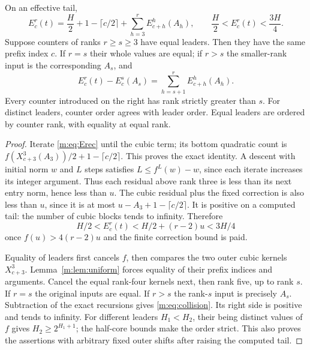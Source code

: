 \begin{lemma}\label{m:lem:counter}
On an effective tail,
\begin{equation}\label{m:eq:counter-expand}
 E^r_c(t)=\frac H2+1-\lceil c/2\rceil
                  +\sum_{h=3}^r E^h_{c+h}(A_h),
 \qquad \frac H2<E^r_c(t)<\frac{3H}{4}.
\end{equation}
Suppose counters of ranks $r\ge s\ge3$ have equal leaders. Then they
have the same prefix index $c$. If $r=s$ their whole values are equal;
if $r>s$ the smaller-rank input is the corresponding $A_s$, and
\begin{equation}\label{m:eq:collision}
 E^r_c(t)-E^s_c(A_s)=\sum_{h=s+1}^r E^h_{c+h}(A_h).
\end{equation}
Every counter introduced on the right has rank strictly greater than $s$.
For distinct leaders, counter order agrees with leader order. Equal
leaders are ordered by counter rank, with equality at equal rank.
\end{lemma}
\begin{proof}
Iterate \eqref{m:eq:Erec} until the cubic term; its bottom quadratic count
is $f(X^3_{c+3}(A_3))/2+1-\lceil c/2\rceil$. This proves the exact
identity. A descent with initial norm $w$ and $L$ steps satisfies
$L\le f^L(w)-w$, since each iterate increases its integer argument.
Thus each residual above rank three is less than its next entry norm,
hence less than $u$. The cubic residual plus the fixed correction is also
less than $u$, since it is at most $u-A_3+1-\lceil c/2\rceil$.
It is positive on a computed tail: the number of cubic blocks tends to
infinity. Therefore
\[
 H/2<E^r_c(t)<H/2+(r-2)u<3H/4
\]
once $f(u)>4(r-2)u$ and the finite correction bound is paid.

Equality of leaders first cancels $f$, then compares the two outer cubic
kernels $X^3_{c+3}$. Lemma~\ref{m:lem:uniform} forces equality of their
prefix indices and arguments. Cancel the equal rank-four kernels next,
then rank five, up to rank $s$. If $r=s$ the original inputs are equal.
If $r>s$ the rank-$s$ input is precisely $A_s$. Subtraction of the exact
recursions gives \eqref{m:eq:collision}. Its right side is positive and tends
to infinity. For different leaders $H_1<H_2$, their being distinct values
of $f$ gives $H_2\ge2^{H_1+1}$; the half-core bounds make the order strict.
This also proves the assertions with arbitrary fixed outer shifts after
raising the computed tail.
\end{proof}

